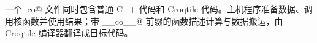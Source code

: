 一个 \co@.co@ 文件同时包含普通 C++ 代码和 Croqtile 代码。主机程序准备数据、调用核函数并使用结果；带 \co@__co__@ 前缀的函数描述计算与数据搬运，由 Croqtile 编译器翻译成目标代码。
